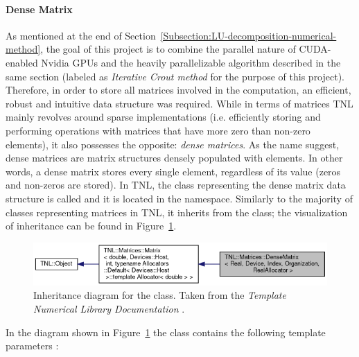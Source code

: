 \paragraph{Dense Matrix}\label{Paragraph:implementation-tnl-library-dense-matrix}
As mentioned at the end of Section~\ref{Subsection:LU-decomposition-numerical-method}, the goal of this project is to combine the parallel nature of CUDA-enabled Nvidia GPUs and the heavily parallelizable algorithm described in the same section (labeled as \textit{Iterative Crout method} for the purpose of this project). \\
Therefore, in order to store all matrices involved in the computation, an efficient, robust and intuitive data structure was required. While in terms of matrices TNL mainly revolves around sparse implementations (i.e. efficiently storing and performing operations with matrices that have more zero than non-zero elements), it also possesses the opposite: \textit{dense matrices}. As the name suggest, dense matrices are matrix structures densely populated with elements. In other words, a dense matrix stores every single element, regardless of its value (zeros and non-zeros are stored). In TNL, the class representing the dense matrix data structure is called  and it is located in the  namespace. Similarly to the majority of classes representing matrices in TNL, it inherits from the  class; the visualization of inheritance can be found in Figure~\ref{Figure:implementation-tnl-library-dense-matrix}.

\begin{figure}[h!]
	\centering
	\includegraphics[width=\textwidth, keepaspectratio]{images/ch2/tnl_matrices_dense_matrix-inheritance.png}
	\caption{Inheritance diagram for the  class. Taken from the \emph{Template Numerical Library Documentation} \cite{Ednu6dyrkWKz1Bv2}.}
	\label{Figure:implementation-tnl-library-dense-matrix}
\end{figure}

In the diagram shown in Figure~\ref{Figure:implementation-tnl-library-dense-matrix} the  class contains the following template parameters \cite{Ednu6dyrkWKz1Bv2}:

